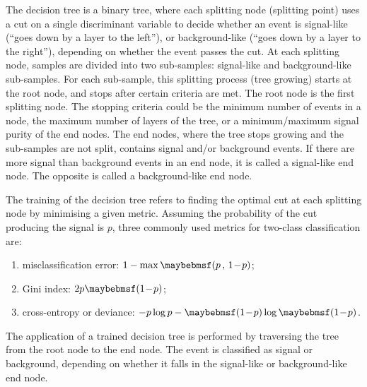 The decision tree is a binary tree, where each splitting node (splitting point) uses a cut on a single discriminant variable to decide whether an event is signal-like (``goes down by a layer to the left''), or background-like (``goes down by a layer to the right''), depending on whether the event passes the cut. At each splitting node, samples are divided into two sub-samples: signal-like and background-like sub-samples. For each sub-sample, this splitting process (tree growing) starts at the  root node, and stops after certain criteria are met. The root node is the first splitting node. The stopping criteria could be the minimum number of events in a node, the maximum number of layers of the tree, or a minimum/maximum signal purity of the end nodes.  The end nodes, where the tree stops growing and the sub-samples are not split, contains signal and/or background events. If there are more signal than background events in an end node, it is called a signal-like end node. The opposite is called a background-like end node.



The training of the decision tree refers to finding the optimal cut at each splitting node by minimising a given metric. Assuming the probability of the cut producing the signal is $p$, three commonly used metrics for two-class classification are:
\begin{enumerate}
\item misclassification error:  $1 - \max\parenths{p\,,\,1\!-\!p}$;
\item Gini index: $2p\parenths{1\!-\!p}$;
\item cross-entropy or deviance: $-p\log{p}-\parenths{1\!-\!p}\log\parenths{1\!-\!p}$.
\end{enumerate}

The application of a trained decision tree is performed by traversing the tree from the root node to the end node. The event is classified as signal or background, depending on whether it falls in the signal-like or background-like end node.



